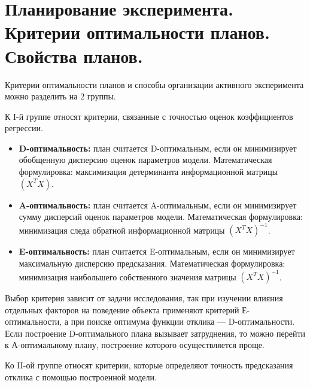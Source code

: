 \section{Планирование эксперимента. Критерии оптимальности планов. Свойства планов.}

Критерии оптимальности планов и способы организации активного эксперимента можно разделить на 2 группы.

К I-й группе относят критерии, связанные с точностью оценок коэффициентов регрессии.

\begin{itemize}
  \item \textbf{D-оптимальность:} план считается D-оптимальным, если он минимизирует обобщенную дисперсию оценок параметров модели. Математическая формулировка: максимизация детерминанта информационной матрицы $(X^T X)$.
  \item \textbf{A-оптимальность:} план считается A-оптимальным, если он минимизирует сумму дисперсий оценок параметров модели. Математическая формулировка: минимизация следа обратной информационной матрицы $(X^T X)^{-1}$.
  \item \textbf{E-оптимальность:} план считается E-оптимальным, если он минимизирует максимальную дисперсию предсказания. Математическая формулировка: минимизация наибольшего собственного значения матрицы $(X^T X)^{-1}$.
\end{itemize}

Выбор критерия зависит от задачи исследования, так при изучении влияния отдельных факторов на поведение объекта применяют критерий Е-оптимальности, а при поиске оптимума функции отклика — D-оптимальности. Если построение D-оптимального плана вызывает затруднения, то можно перейти к А-оптимальному плану, построение которого осуществляется проще.

Ко II-ой группе относят критерии, которые определяют точность предсказания отклика с помощью построенной модели.

